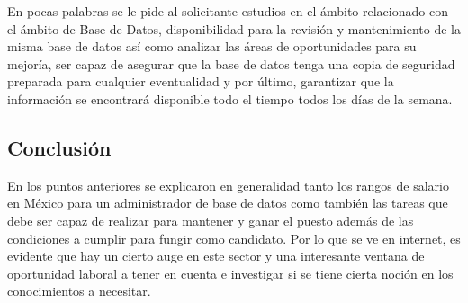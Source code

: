 \documentclass{article}
\begin{document}
En pocas palabras se le pide al solicitante estudios en el ámbito relacionado con el ámbito de Base de Datos,
disponibilidad para la revisión y mantenimiento de la misma base de datos así como analizar las áreas de oportunidades para
su mejoría, ser capaz de asegurar que la base de datos tenga una copia de seguridad preparada para cualquier eventualidad y
por último, garantizar que la información se encontrará disponible todo el tiempo todos los días de la semana.


\subsection{Conclusión}
En los puntos anteriores se explicaron en generalidad tanto los rangos de salario en México para un administrador
de base de datos como también las tareas que debe ser capaz de realizar para mantener y ganar el puesto además de las condiciones a
cumplir para fungir como candidato. Por lo que se ve en internet, es evidente que hay un cierto auge en este sector y una interesante ventana de
oportunidad laboral a tener en cuenta e investigar si se tiene cierta noción en los conocimientos a necesitar.



\end{document}
